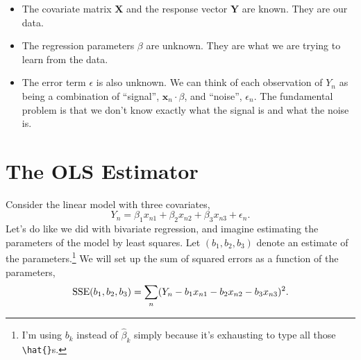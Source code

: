 \documentclass[
  12pt,
  oneside,openany]{book}
\begin{document}
\begin{itemize}
\item
  The covariate matrix \(\mathbf{X}\) and the response vector \(\mathbf{Y}\) are known. They are our data.
\item
  The regression parameters \(\beta\) are unknown. They are what we are trying to learn from the data.
\item
  The error term \(\epsilon\) is also unknown. We can think of each observation of \(Y_n\) as being a combination of ``signal'', \(\mathbf{x}_n \cdot \beta\), and ``noise'', \(\epsilon_n\). The fundamental problem is that we don't know exactly what the signal is and what the noise is.
\end{itemize}

\hypertarget{the-ols-estimator}{%
\section{The OLS Estimator}\label{the-ols-estimator}}

Consider the linear model with three covariates,
\[
Y_n = \beta_1 x_{n1} + \beta_2 x_{n2} + \beta_3 x_{n3} + \epsilon_n.
\]
Let's do like we did with bivariate regression, and imagine estimating the parameters of the model by least squares. Let \((b_1, b_2, b_3)\) denote an estimate of the parameters.\footnote{I'm using \(b_k\) instead of \(\hat{\beta}_k\) simply because it's exhausting to type all those \texttt{\textbackslash{}hat\{\}}s.} We will set up the sum of squared errors as a function of the parameters,
\[
\mathop{\rm SSE}\nolimits(b_1, b_2, b_3)
= \sum_n (Y_n - b_1 x_{n1} - b_2 x_{n2} - b_3 x_{n3})^2.
\]
\end{document}
